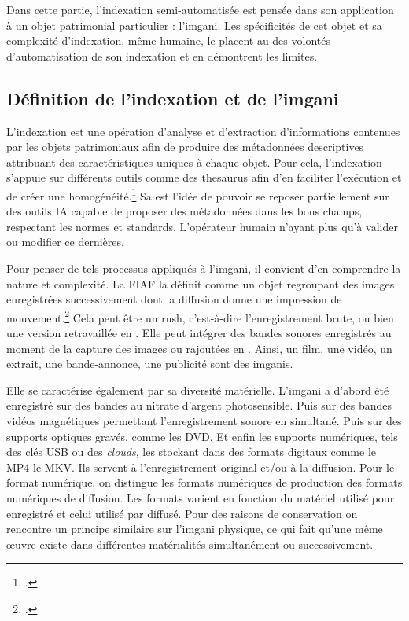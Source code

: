 
\label{imageAnimee}

Dans cette partie, l'indexation semi-automatisée est pensée dans son application à un objet patrimonial particulier : l'\gls{imgani}. Les spécificités de cet objet et sa complexité d'indexation, même humaine, le placent au \coeur des volontés d'automatisation de son indexation et en démontrent les limites.

\subsection{Définition de l'indexation et de l'\gls{imgani} }

L'indexation est une opération d'analyse et d'extraction d'informations contenues par les objets patrimoniaux afin de produire des métadonnées descriptives attribuant des caractéristiques uniques à chaque objet. Pour cela, l'indexation s’appuie sur différents outils comme des \gls{thesaurus} afin d'en faciliter l'exécution et de créer une homogénéité.\footcite[p.2]{directiondesarchivesdefranceNoteDinformationDITN2007} Sa  est l'idée de pouvoir se reposer partiellement sur des outils \gls{IA} capable de proposer des métadonnées dans les bons champs, respectant les normes et standards. L'opérateur humain n'ayant plus qu'à valider ou modifier ce dernières.

Pour penser de tels processus appliqués à l'\gls{imgani}, il convient d'en comprendre la nature et complexité. La \gls{FIAF} la définit comme un objet regroupant des images enregistrées successivement dont la diffusion donne une impression de mouvement.\footcite[p.5]{fairbairnManuelCatalogageImages} Cela peut être un \gls{rush}, c'est-à-dire l'enregistrement brute, ou bien une version retravaillée en . Elle peut intégrer des bandes sonores enregistrés au moment de la capture des images ou rajoutées en . Ainsi, un film, une vidéo, un extrait, une bande-annonce, une publicité sont des \glspl{imgani}.

Elle se caractérise également par sa diversité matérielle. L'\gls{imgani} a d'abord été enregistré sur des bandes au nitrate d'argent photosensible. Puis sur des bandes vidéos magnétiques permettant l'enregistrement sonore en simultané. Puis sur des supports optiques gravés, comme les DVD. Et enfin les supports numériques, tels des clés USB ou des \textit{clouds}, les stockant dans des formats digitaux comme le MP4 le MKV. Ils servent à l'enregistrement original et/ou à la diffusion. Pour le format numérique, on distingue les formats numériques de production des formats numériques de diffusion. Les formats varient en fonction du matériel utilisé pour enregistré et celui utilisé par diffusé. Pour des raisons de conservation on rencontre un principe similaire sur l'\gls{imgani} physique, ce qui fait qu'une même \oe{uvre} existe dans différentes matérialités simultanément ou successivement.\newline %

